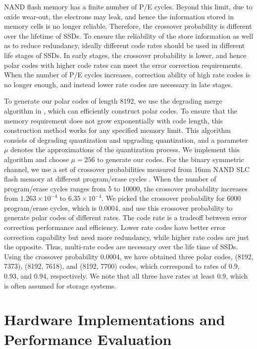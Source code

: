 \documentclass{article}
\begin{document}
NAND flash memory has a finite number of P/E cycles. Beyond this limit, due to oxide wear-out, the electrons may leak, and hence the information stored in memory cells is no longer reliable. Therefore,  the crossover probability is different over the lifetime of SSDs. To ensure the reliability of the store information as well as to reduce redundancy, ideally different code rates should be used in different life stages of SSDs. In early stages, the crossover probability is lower, and hence polar codes with higher code rates can meet the error correction requirements. When the number of P/E cycles increases, correction ability of high rate codes is no longer enough, and instead lower rate codes are necessary in late stages.

To generate our polar codes of length 8192, we use the degrading merge algorithm in \cite{tal2013construct}, which can efficiently construct polar codes. To ensure that the memory requirement does not grow exponentially with code length, this construction method works for any specified memory limit. This algorithm consists of degrading quantization and upgrading quantization, and a parameter $\mu$ denotes the approximations of the quantization process. We implement this algorithm and choose $\mu = 256$ to generate our codes. For the binary symmetric channel, we use a set of crossover probabilities measured from 16nm NAND SLC flash memory at different program/erase cycles \cite{CommunicationWithYueLi}. When the number of program/erase cycles ranges from 5 to 10000, the crossover probability increases from $1.263\times 10^{-4}$ to $6.35\times 10^{-4}$. We picked the crossover probability for 6000 program/erase cycles, which is 0.0004, and use this crossover probability to generate polar codes of different rates. The code rate is a tradeoff between error correction performance and efficiency. Lower rate codes have better error correction capability but need more redundancy, while higher rate codes are just the opposite. Thus, multi-rate codes are necessary over the life time of SSDs. Using the crossover probability 0.0004, we have obtained three polar codes, (8192, 7373), (8192, 7618), and (8192, 7700) codes, which correspond to rates of 0.9, 0.93, and 0.94, respectively. We note that all three have rates at least 0.9, which is often assumed for storage systems.




\section{Hardware Implementations and Performance Evaluation}
\label{sec:Performance}
\end{document}
